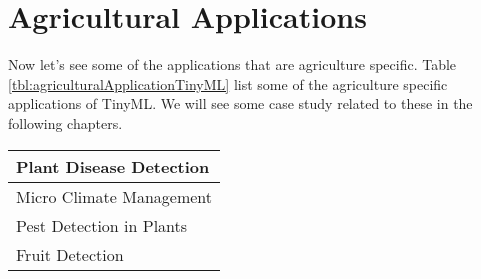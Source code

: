 \documentclass[../../main]{subfiles}
\begin{document}
\section{Agricultural Applications} \label{sec:}

Now let's see some of the applications that are agriculture specific.
Table \ref{tbl:agriculturalApplicationTinyML} list some of the agriculture
specific applications of TinyML. We will see some case study related to
these in the following chapters.

\begin{center}

    \renewcommand\arraystretch{1.75}

    \begin{tabularx} {\textwidth} {
            >{\centering\arraybackslash}X
        }

        \toprule
        \midrule

        Plant Disease Detection \\ \midrule
        Micro Climate Management \\ \midrule
        Pest Detection in Plants \\ \midrule
        Fruit Detection \\

        \midrule
        \bottomrule

    \end{tabularx}

    \label{tbl:agriculturalApplicationTinyML}

\end{center}
\end{document}
